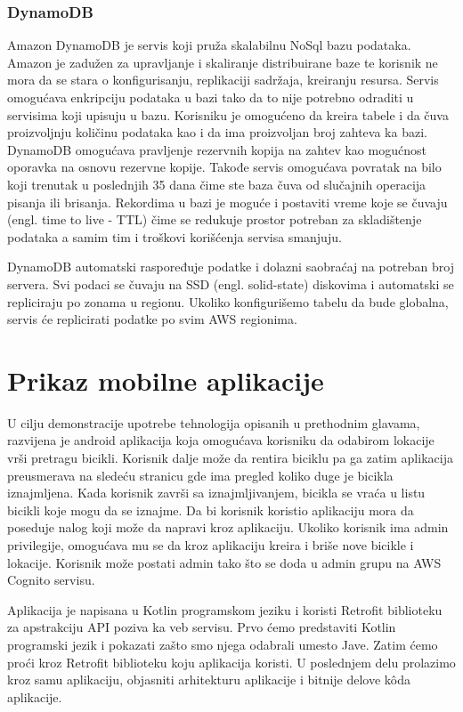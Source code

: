\documentclass[12pt,oneside]{memoir}
\begin{document}
\subsection{DynamoDB}

Amazon DynamoDB je servis koji pruža skalabilnu NoSql bazu podataka. Amazon je zadužen za upravljanje i skaliranje distribuirane baze te korisnik ne mora da se stara o konfigurisanju, replikaciji sadržaja, kreiranju resursa. Servis omogućava enkripciju podataka u bazi tako da to nije potrebno odraditi u servisima koji upisuju u bazu. Korisniku je omogućeno da kreira tabele i da čuva proizvoljnju količinu podataka kao i da ima proizvoljan broj zahteva ka bazi. DynamoDB omogućava pravljenje rezervnih kopija na zahtev kao mogućnost oporavka na osnovu rezervne kopije. Takođe servis omogućava povratak na bilo koji trenutak u poslednjih 35 dana čime ste baza čuva od slučajnih operacija pisanja ili brisanja. Rekordima u bazi je moguće i postaviti vreme koje se čuvaju (engl. time to live - TTL) čime se redukuje prostor potreban za skladištenje podataka a samim tim i troškovi korišćenja servisa smanjuju.

DynamoDB automatski raspoređuje podatke i dolazni saobraćaj na potreban broj servera. Svi podaci se čuvaju na SSD (engl. solid-state) diskovima i automatski se repliciraju po zonama u regionu. Ukoliko konfigurišemo tabelu da bude globalna, servis će replicirati podatke po svim AWS regionima.

\chapter{Prikaz mobilne aplikacije}
 
U cilju demonstracije upotrebe tehnologija opisanih u prethodnim glavama, razvijena je android aplikacija koja omogućava korisniku da odabirom lokacije vrši pretragu bicikli. Korisnik dalje može da rentira biciklu pa ga zatim aplikacija preusmerava na sledeću stranicu gde ima pregled koliko duge je bicikla iznajmljena. Kada korisnik završi sa iznajmljivanjem, bicikla se vraća u listu bicikli koje mogu da se iznajme. Da bi korisnik koristio aplikaciju mora da poseduje nalog koji može da napravi kroz aplikaciju. Ukoliko korisnik ima admin privilegije, omogućava mu se da kroz aplikaciju kreira i briše nove bicikle i lokacije. Korisnik može postati admin tako što se doda u admin grupu na AWS Cognito servisu.
 
Aplikacija je napisana u Kotlin programskom jeziku i koristi Retrofit biblioteku za apstrakciju API poziva ka veb servisu. Prvo ćemo predstaviti Kotlin programski jezik i pokazati zašto smo njega odabrali umesto Jave. Zatim ćemo proći kroz Retrofit biblioteku koju aplikacija koristi. U poslednjem delu prolazimo kroz samu aplikaciju, objasniti arhitekturu aplikacije i bitnije delove kôda aplikacije.
\end{document}
